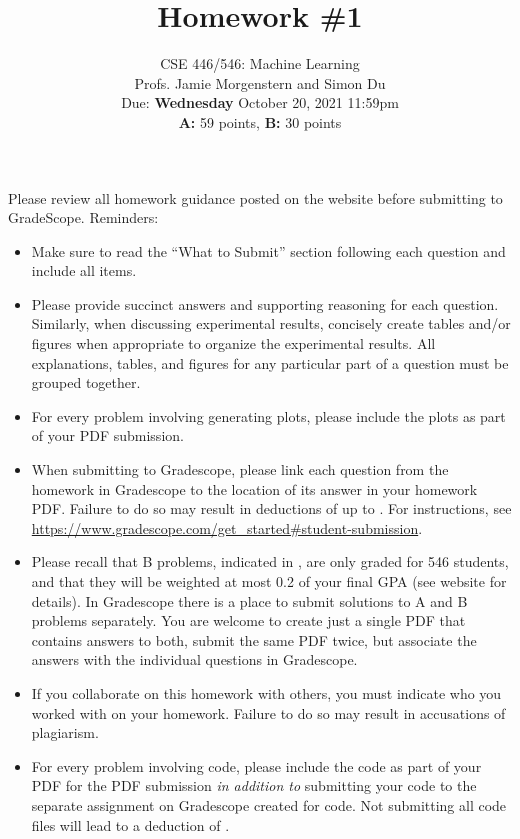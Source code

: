 \documentclass{article}
\begin{document}
\setcounter{aprob}{0}
\setcounter{bprob}{0}
\title{Homework \#1}
\author{
    \normalsize{CSE 446/546: Machine Learning}\\
    \normalsize{Profs. Jamie Morgenstern and Simon Du}\\
    \normalsize{Due: \textbf{Wednesday} October 20, 2021 11:59pm}\\
    \normalsize{\textbf{A:} 59 points, \textbf{B:} 30 points}
}
\date{{}}
\maketitle

\noindent Please review all homework guidance posted on the website before submitting to GradeScope. Reminders:
\begin{itemize}
    \item Make sure to read the ``What to Submit'' section following each question and include all items.
    \item Please provide succinct answers and supporting reasoning for each question. Similarly, when discussing experimental results, concisely create tables and/or figures when appropriate to organize the experimental results. All explanations, tables, and figures for any particular part of a question must be grouped together.
    \item For every problem involving generating plots, please include the plots as part of your PDF submission.
    \item When submitting to Gradescope, please link each question from the homework in Gradescope to the location of its answer in your homework PDF. Failure to do so may result in deductions of up to . For instructions, see \url{https://www.gradescope.com/get_started#student-submission}.
    \item Please recall that B problems, indicated in , are only graded for 546 students, and that they will be weighted at most 0.2 of your final GPA (see website for details). In Gradescope there is a place to submit solutions to A and B problems separately. You are welcome to create just a single PDF that contains answers to both, submit the same PDF twice, but associate the answers with the individual questions in Gradescope. 
    \item If you collaborate on this homework with others, you must indicate who you worked with on your homework. Failure to do so may result in accusations of plagiarism.
    \item For every problem involving code, please include the code as part of your PDF for the PDF submission \emph{in addition to} submitting your code to the separate assignment on Gradescope created for code. Not submitting all code files will lead to a deduction of .  
\end{itemize}
\end{document}
